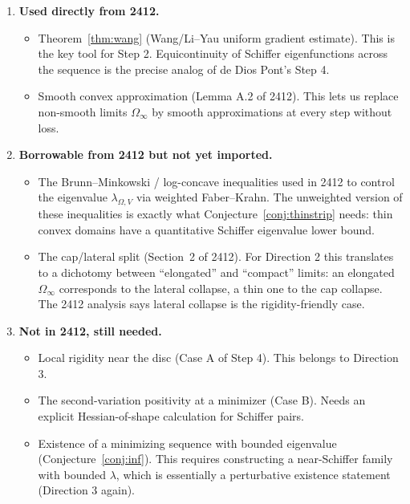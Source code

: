 \documentclass[11pt]{article}
\newcommand{\Om}{\Omega}
\newcommand{\1}{\mathbf 1}
\begin{document}
\begin{enumerate}[leftmargin=*]
    \item \textbf{Used directly from 2412.}
    \begin{itemize}[leftmargin=*]
        \item Theorem~\ref{thm:wang} (Wang/Li--Yau uniform gradient
        estimate). This is the key tool for Step 2.
        Equicontinuity of Schiffer eigenfunctions across the
        sequence is the precise analog of de Dios Pont's Step 4.
        \item Smooth convex approximation (Lemma A.2 of 2412). This
        lets us replace non-smooth limits $\Om_\infty$ by smooth
        approximations at every step without loss.
    \end{itemize}

    \item \textbf{Borrowable from 2412 but not yet imported.}
    \begin{itemize}[leftmargin=*]
        \item The Brunn--Minkowski / log-concave inequalities used in
        2412 to control the eigenvalue $\lambda_{\Om,V}$ via
        weighted Faber--Krahn. The unweighted version of these
        inequalities is exactly what Conjecture~\ref{conj:thinstrip}
        needs: thin convex domains have a quantitative Schiffer
        eigenvalue lower bound.
        \item The cap/lateral split (Section~2 of 2412). For
        Direction 2 this translates to a dichotomy between
        ``elongated'' and ``compact'' limits: an elongated
        $\Om_\infty$ corresponds to the lateral collapse, a thin one
        to the cap collapse. The 2412 analysis says lateral
        collapse is the rigidity-friendly case.
    \end{itemize}

    \item \textbf{Not in 2412, still needed.}
    \begin{itemize}[leftmargin=*]
        \item Local rigidity near the disc (Case A of Step 4).
        This belongs to Direction 3.
        \item The second-variation positivity at a minimizer
        (Case B). Needs an explicit Hessian-of-shape calculation
        for Schiffer pairs.
        \item Existence of a minimizing sequence with bounded
        eigenvalue (Conjecture~\ref{conj:inf}). This requires
        constructing a near-Schiffer family with bounded $\lambda$,
        which is essentially a perturbative existence statement
        (Direction 3 again).
    \end{itemize}
\end{enumerate}
\end{document}
